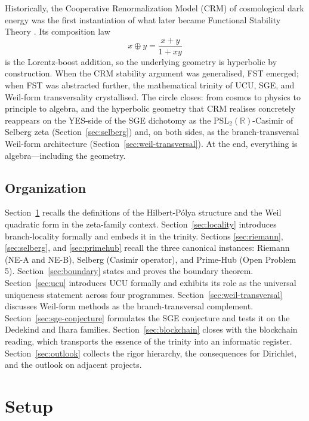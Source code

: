 \documentclass[11pt]{article}
\theoremstyle{definition}
\theoremstyle{remark}
\newcommand{\PSL}{\mathrm{PSL}}
\begin{document}
Historically, the Cooperative Renormalization Model (CRM) of
cosmological dark energy was the first instantiation of what later
became Functional Stability Theory \cite{RFEPFramework}. Its
composition law
\[
  x \oplus y = \frac{x + y}{1 + xy}
\]
is the Lorentz-boost addition, so the underlying geometry is
hyperbolic by construction. When the CRM stability argument was
generalised, FST emerged; when FST was abstracted further, the
mathematical trinity of UCU, SGE, and Weil-form transversality
crystallised. The circle closes: from cosmos to physics to
principle to algebra, and the hyperbolic geometry that CRM realises
concretely reappears on the YES-side of the SGE dichotomy as the
$\PSL_2(\mathbb{R})$-Casimir of Selberg zeta
(Section~\ref{sec:selberg}) and, on both sides, as the
branch-transversal Weil-form architecture
(Section~\ref{sec:weil-transversal}). At the end, everything is
algebra---including the geometry.

\subsection{Organization}
\label{sec:intro-organization}

Section~\ref{sec:setup} recalls the definitions of the
Hilbert-P\'olya structure and the Weil quadratic form in the
zeta-family context. Section~\ref{sec:locality} introduces
branch-locality formally and embeds it in the trinity. Sections
\ref{sec:riemann}, \ref{sec:selberg}, and \ref{sec:primehub} recall
the three canonical instances: Riemann (NE-A and NE-B), Selberg
(Casimir operator), and Prime-Hub (Open Problem 5).
Section~\ref{sec:boundary} states and proves the boundary theorem.
Section~\ref{sec:ucu} introduces UCU formally and exhibits its
role as the universal uniqueness statement across four programmes.
Section~\ref{sec:weil-transversal} discusses Weil-form methods as
the branch-transversal complement. Section~\ref{sec:sge-conjecture}
formulates the SGE conjecture and tests it on the Dedekind and
Ihara families. Section~\ref{sec:blockchain} closes with the
blockchain reading, which transports the essence of the trinity
into an informatic register. Section~\ref{sec:outlook} collects
the rigor hierarchy, the consequences for Dirichlet, and the
outlook on adjacent projects.

\section{Setup}
\label{sec:setup}
\end{document}

